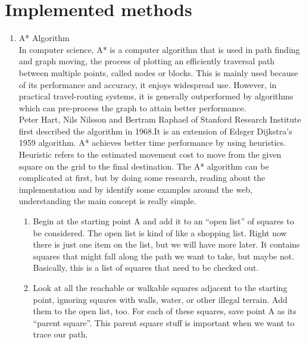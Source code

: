 \documentclass[twocolumn]{IEEEtran}
\begin{document}
\section{Implemented methods} 
	\begin{enumerate}
    
    \item A* Algorithm\\
    
    In computer science, A* is a computer algorithm that is used in path finding and graph moving, the process of plotting an efficiently traversal path between multiple points, called nodes or blocks. This is mainly used because of its performance and accuracy, it enjoys widespread use. However, in practical travel-routing systems, it is generally outperformed by algorithms which can pre-process the graph to attain better performance.\\

Peter Hart, Nils Nilsson and Bertram Raphael of Stanford Research Institute first described the algorithm in 1968.It is an extension of Edsger Dijkstra's 1959 algorithm. A* achieves better time performance by using heuristics. Heuristic refers to the estimated movement cost to move from the given square on the grid to the final destination. The A* algorithm can be complicated at first, but by doing some research, reading about the implementation and by identify some examples around the web, understanding the main concept is really simple.\cite{24} \cite{30} \cite{34}\\

	\begin{enumerate}
    
	\item Begin at the starting point A and add it to an “open list” of squares to be considered. The open list is kind of like a shopping list. Right now there is just one item on the list, but we will have more later. It contains squares that might fall along the path we want to take, but maybe not. Basically, this is a list of squares that need to be checked out.
    
    \item Look at all the reachable or walkable squares adjacent to the starting point, ignoring squares with walls, water, or other illegal terrain. Add them to the open list, too. For each of these squares, save point A as its “parent square”. This parent square stuff is important when we want to trace our path.
    

\end{enumerate}
\end{enumerate}
\end{document}
